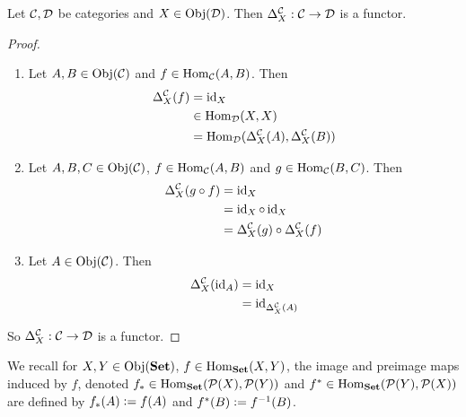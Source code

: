 \documentclass{book}
\begin{document}
\begin{ex} 
	Let $\mathcal{C}, \mathcal{D}$ be categories and $X \in \operatorname{Obj}(\mathcal{D})$. Then $\Delta^{\mathcal{C}}_X : \mathcal{C} \rightarrow \mathcal{D}$ is a functor.
\end{ex}

\begin{proof}\
	\begin{enumerate}
		\item Let $A, B \in \operatorname{Obj}(\mathcal{C})$ and $f \in \operatorname{Hom}_{\mathcal{C}}(A, B)$. Then 
		\begin{align*}
			\Delta^{\mathcal{C}}_X (f)
			& = \operatorname{id}_X \\
			& \in \operatorname{Hom}_{\mathcal{D}}(X, X) \\
			& = \operatorname{Hom}_{\mathcal{D}}(\Delta^{\mathcal{C}}_X (A), \Delta^{\mathcal{C}}_X (B))
		\end{align*}  
		\item Let $A,B,C \in \operatorname{Obj}(\mathcal{C})$, $f \in \operatorname{Hom}_{\mathcal{C}}(A, B)$ and $g \in \operatorname{Hom}_{\mathcal{C}}(B, C)$. Then 
		\begin{align*}
			\Delta^{\mathcal{C}}_X (g \circ f) 
			& = \operatorname{id}_X \\
			& = \operatorname{id}_X \circ \operatorname{id}_X \\
			& = \Delta^{\mathcal{C}}_X (g) \circ \Delta^{\mathcal{C}}_X (f)
		\end{align*} 
		\item Let $A \in \operatorname{Obj}(\mathcal{C})$. Then 
		\begin{align*}
			\Delta^{\mathcal{C}}_X (\operatorname{id}_A)
			& = \operatorname{id}_X \\
			& = \operatorname{id}_{\Delta^{\mathcal{C}}_X (A)}
		\end{align*}
	\end{enumerate}
	So $\Delta^{\mathcal{C}}_X : \mathcal{C} \rightarrow \mathcal{D}$ is a functor.
\end{proof}




\begin{note}
	We recall for $X,Y \in \operatorname{Obj}(\text{\textbf{Set}})$, $f \in \operatorname{Hom}_{\text{\textbf{Set}}}(X,Y)$, the image and preimage maps induced by $f$, denoted $f_* \in \operatorname{Hom}_{\text{\textbf{Set}}}(\mathcal{P}(X), \mathcal{P}(Y))$ and $f^* \in \operatorname{Hom}_{\text{\textbf{Set}}}(\mathcal{P}(Y), \mathcal{P}(X))$ are defined by $f_*(A) \vcentcolon= f(A)$ and $f^*(B) \vcentcolon= f^{-1}(B)$. 
\end{note}
\end{document}
